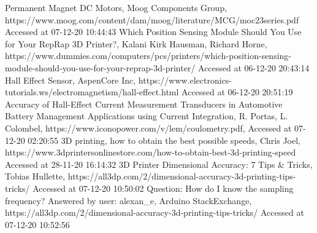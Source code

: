 \documentclass[conference]{IEEEtran}
\begin{document}
\newpage

\begin{thebibliography}{00}
 Permanent Magnet DC Motors, Moog Components Group, https://www.moog.com/content/dam/moog/literature/MCG/moc23series.pdf Accessed at 07-12-20 10:44:43
 Which Position Sensing Module Should You Use for Your RepRap 3D Printer?, Kalani Kirk Hausman, Richard Horne, https://www.dummies.com/computers/pcs/printers/which-position-sensing-module-should-you-use-for-your-reprap-3d-printer/ Accessed at 06-12-20 20:43:14
 Hall Effect Sensor, AspenCore Inc, https://www.electronics-tutorials.ws/electromagnetism/hall-effect.html Accessed at 06-12-20 20:51:19
 Accuracy of Hall-Effect Current Measurement Transducers in Automotive Battery Management Applications using Current Integration, R. Portas, L. Colombel, https://www.iconopower.com/v/lem/coulometry.pdf, Accessed at 07-12-20 02:20:55
 3D printing, how to obtain the best possible speeds, Chris Joel, https://www.3dprintersonlinestore.com/how-to-obtain-best-3d-printing-speed Accessed at 28-11-20 16:14:32
 3D Printer Dimensional Accuracy: 7 Tips \& Tricks, Tobias Hullette, https://all3dp.com/2/dimensional-accuracy-3d-printing-tips-tricks/ Accessed at 07-12-20 10:50:02
 Question: How do I know the sampling frequency? Answered by user: alexan\_e, Arduino StackExchange, https://all3dp.com/2/dimensional-accuracy-3d-printing-tips-tricks/ Accessed at 07-12-20 10:52:56
\end{thebibliography}
\end{document}
